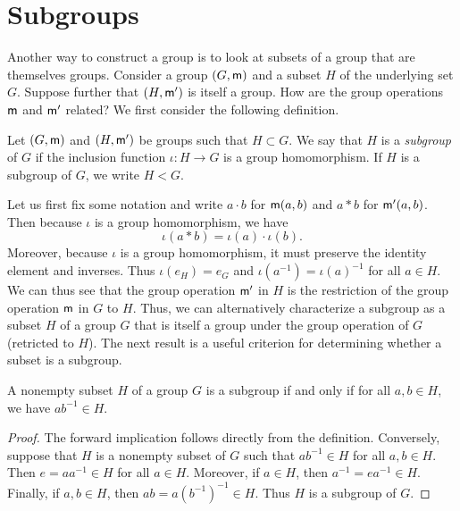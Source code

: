 \section{Subgroups}

\begin{remark}
    Another way to construct a group is to look at subsets of a group that are
    themselves groups. Consider a group \((G, {\mathsf{m}})\) and a subset \(H\) of the
    underlying set \(G\). Suppose further that \((H, {\mathsf{m}}')\) is itself a
    group. How are the group operations \({\mathsf{m}}\) and \({\mathsf{m}}'\) related? We
    first consider the following definition.
\end{remark}

\begin{definition}
    Let \((G, {\mathsf{m}})\) and \((H, {\mathsf{m}}')\) be groups such that \(H \subset G\).
    We say that \(H\) is a \emph{subgroup} of \(G\) if the inclusion function
    \(\iota : H \to G\) is a group homomorphism. If \(H\) is a subgroup of
    \(G\), we write \(H < G\).
\end{definition}

\begin{remark}
    Let us first fix some notation and write \(a \cdot b\) for \({\mathsf{m}}(a,b)\)
    and \(a * b\) for \({\mathsf{m}}'(a,b)\). Then because \(\iota\) is a group
    homomorphism, we have
    \[
        \iota(a * b) = \iota(a) \cdot \iota(b).
    \]
    Moreover, because \(\iota\) is a group homomorphism, it must preserve the
    identity element and inverses. Thus \(\iota(e_H) = e_G\) and \(\iota(a^{-1})
    = \iota(a)^{-1}\) for all \(a \in H\). We can thus see that the group
    operation \({\mathsf{m}}'\) in \(H\) is the restriction of the group operation
    \({\mathsf{m}}\) in \(G\) to \(H\). Thus, we can alternatively characterize a
    subgroup as a subset \(H\) of a group \(G\) that is itself a group under the
    group operation of \(G\) (retricted to \(H\)). The next result is a useful
    criterion for determining whether a subset is a subgroup.
\end{remark}

\begin{theorem}
    \label{thm:subgroup-test}
    A nonempty subset \(H\) of a group \(G\) is a subgroup if and only if for
    all \(a, b \in H\), we have \(ab^{-1} \in H\).
\end{theorem}

\begin{proof}
    The forward implication follows directly from the definition. Conversely,
    suppose that \(H\) is a nonempty subset of \(G\) such that \(ab^{-1} \in H\)
    for all \(a, b \in H\). Then \(e = aa^{-1} \in H\) for all \(a \in H\).
    Moreover, if \(a \in H\), then \(a^{-1} = ea^{-1} \in H\). Finally, if \(a,
    b \in H\), then \(ab = a(b^{-1})^{-1} \in H\). Thus \(H\) is a subgroup of
    \(G\).
\end{proof}

